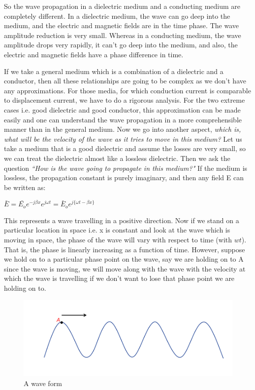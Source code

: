 So the wave propagation in a dielectric medium and a conducting medium are completely different. In a dielectric medium, the wave can go deep into the medium, and the electric and magnetic fields are in the time phase. The wave amplitude reduction is very small. Whereas in a conducting medium, the wave amplitude drops very rapidly, it can't go deep into the medium, and also, the electric and magnetic fields have a phase difference in time.

If we take a general medium which is a combination of a dielectric and a conductor, then all these relationships are going to be complex as we don't have any approximations. For those media, for which conduction current is comparable to displacement current, we have to do a rigorous analysis. For the two extreme cases i.e. good dielectric and good conductor, this approximation can be made easily and one can understand the wave propagation in a more comprehensible manner than in the general medium.
Now we go into another aspect, \emph{which is, what will be the velocity of the wave as it tries to move in this medium?} Let us take a medium that is a good dielectric and assume the losses are very small, so we can treat the dielectric almost like a lossless dielectric. Then we ask the question \emph{``How is the wave going to propagate in this medium?"} If the medium is lossless, the propagation constant is purely imaginary, and then any field E can be written as:
\begin{center}
$\bar{E}=\bar{E_{o}}e^{-j\beta x}e^{j\omega t}=\bar{E}_{o}e^{j\{\omega t-\beta x\}} $
\end{center}

This represents a wave travelling in a positive direction. Now if we stand on a particular location in space i.e. x is constant and look at the wave which is moving in space, the phase of the wave will vary with respect to time (with $wt$). That is, the phase is linearly increasing as a function of time. However, suppose we hold on to a particular phase point on the wave, say we are holding on to A since the wave is moving, we will move along with the wave with the velocity at which the wave is travelling if we don't want to lose that phase point we are holding on to.
\begin{figure}[h]
\centering
\includegraphics[width=1\linewidth]{./graphics/constant_phase}
\caption{A wave form}
\end{figure}

